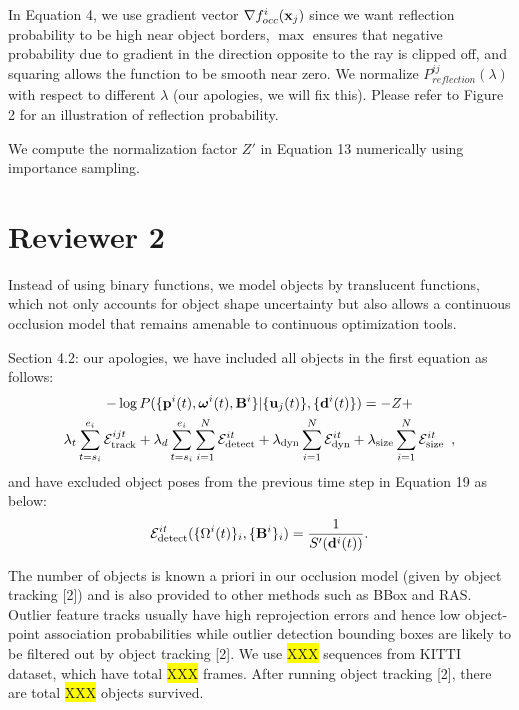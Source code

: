 \documentclass[10pt,twocolumn,letterpaper]{article}
\newcommand{\hili}[1]{\colorbox{yellow}{#1}}
\begin{document}
In Equation 4, we use gradient vector $\nabla {f^i_{occ}}(\mathbf{x}_j)$ since we want reflection probability to be high near object borders, $\max$ ensures that negative probability due to gradient in the direction opposite to the ray is clipped off, and squaring allows the function to be smooth near zero. We normalize $P^{ij}_{\textit{reflection}}(\lambda)$  with respect to different $\lambda$ (our apologies, we will fix this). Please refer to Figure 2 for an illustration of reflection probability.

We compute the normalization factor $Z'$ in Equation 13 numerically using importance sampling.

\section{Reviewer 2}

Instead of using binary functions, we model objects by translucent functions, which not only accounts for object shape uncertainty but also allows a continuous occlusion model that remains amenable to continuous optimization tools. 

Section 4.2: our apologies, we have included all objects in the first equation as follows:
\begin{multline*}
  -\log{P(\{ \mathbf{p}^i(t) , \bm{\omega}^i(t) , \mathbf{B}^i \} | \{\mathbf{u}_j(t)\} , \{\mathbf{d}^{i}(t)\} )} = -Z + \\ 
  \lambda_t \sum_{t=s_i}^{e_i} \mathcal{E}^{ijt}_{\text{track}}
  + 
  \lambda_d \sum_{t=s_i}^{e_i} \sum_{i=1}^N \mathcal{E}^{it}_{\text{detect}}
  + 
  \lambda_{\text{dyn}} \sum_{i=1}^N \mathcal{E}^{it}_{\text{dyn}}
  + 
  \lambda_{\text{size}} \sum_{i=1}^N \mathcal{E}^{it}_{\text{size}}
  \enspace,
\end{multline*}
and have excluded object poses from the previous time step in Equation 19 as below:
\begin{align*}
\mathcal{E}^{it}_{\text{detect}}(\{ \Omega^{i}(t) \}_i, \{\mathbf{B}^{i}\}_i ) = \frac{1}{S'(\mathbf{d}^{i}(t))}.
\end{align*}

The number of objects is known a priori in our occlusion model (given by object tracking [2]) and is also provided to other methods such as BBox and RAS. Outlier feature tracks usually have high reprojection errors and hence low object-point association probabilities while outlier detection bounding boxes are likely to be filtered out by object tracking [2]. We use \hili{XXX} sequences from KITTI dataset, which have total \hili{XXX} frames. After running object tracking [2], there are total \hili{XXX} objects survived.
\end{document}
